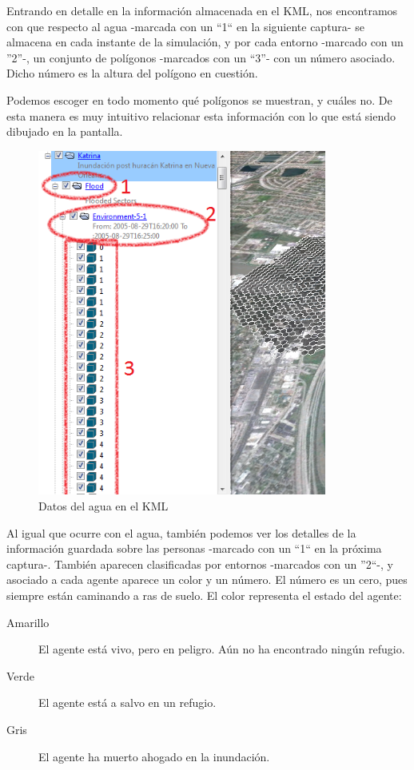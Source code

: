 Entrando en detalle en la información almacenada en el KML, nos encontramos con
que respecto al agua -marcada con un ``1`` en la siguiente captura- se almacena
en cada instante de la simulación, y por cada entorno -marcado con un ''2''-, un
conjunto de polígonos -marcados con un ``3''- con un número asociado. Dicho
número es la altura del polígono en cuestión.

Podemos escoger en todo momento qué polígonos se muestran, y cuáles no. De esta
manera es muy intuitivo relacionar esta información con lo que está siendo
dibujado en la pantalla.

\begin{figure}[H]
 \centering
 \includegraphics[width=95mm]{figuras/cap6/resultados/flood_data.png}
 \caption{Datos del agua en el KML}
\end{figure}

Al igual que ocurre con el agua, también podemos ver los detalles de la
información guardada sobre las personas -marcado con un ``1`` en la próxima
captura-. También aparecen clasificadas por entornos -marcados con un ''2``-, y
asociado a cada agente aparece un color y un número. El número es un cero, pues
siempre están caminando a ras de suelo. El color representa el estado del
agente:

\begin{description}
 \item[Amarillo] El agente está vivo, pero en peligro. Aún no ha encontrado
 ningún refugio.
 \item[Verde] El agente está a salvo en un refugio.
 \item[Gris] El agente ha muerto ahogado en la inundación.
\end{description}

